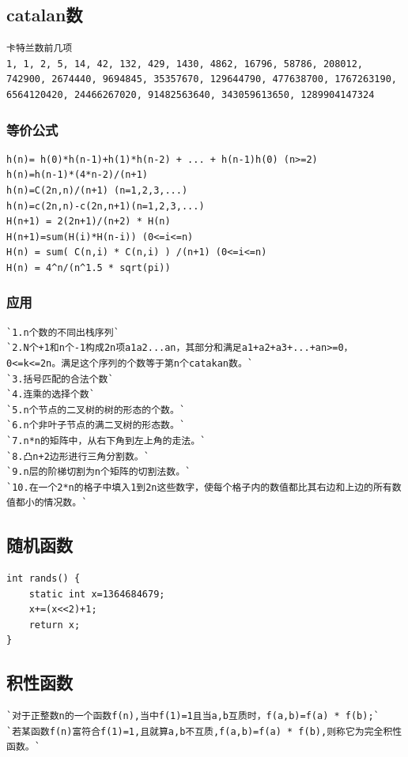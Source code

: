 \documentclass[a4paper]{article}
\begin{document}
\begin{CJK*}{UTF8}{gbsn}
\begin{multicols}{3}
\begin{flushleft}
\subsection{catalan数}
\begin{lstlisting}
卡特兰数前几项
1, 1, 2, 5, 14, 42, 132, 429, 1430, 4862, 16796, 58786, 208012, 742900, 2674440, 9694845, 35357670, 129644790, 477638700, 1767263190, 6564120420, 24466267020, 91482563640, 343059613650, 1289904147324 
\end{lstlisting}

\subsubsection{等价公式}
\begin{lstlisting}
h(n)= h(0)*h(n-1)+h(1)*h(n-2) + ... + h(n-1)h(0) (n>=2)
h(n)=h(n-1)*(4*n-2)/(n+1)
h(n)=C(2n,n)/(n+1) (n=1,2,3,...)
h(n)=c(2n,n)-c(2n,n+1)(n=1,2,3,...)
H(n+1) = 2(2n+1)/(n+2) * H(n)
H(n+1)=sum(H(i)*H(n-i)) (0<=i<=n)
H(n) = sum( C(n,i) * C(n,i) ) /(n+1) (0<=i<=n)
H(n) = 4^n/(n^1.5 * sqrt(pi))
\end{lstlisting}

\subsubsection{应用}
\begin{lstlisting}
`1.n个数的不同出栈序列`
`2.N个+1和n个-1构成2n项a1a2...an，其部分和满足a1+a2+a3+...+an>=0，0<=k<=2n。满足这个序列的个数等于第n个catakan数。`
`3.括号匹配的合法个数`
`4.连乘的选择个数`
`5.n个节点的二叉树的树的形态的个数。`
`6.n个非叶子节点的满二叉树的形态数。`
`7.n*n的矩阵中，从右下角到左上角的走法。`
`8.凸n+2边形进行三角分割数。`
`9.n层的阶梯切割为n个矩阵的切割法数。`
`10.在一个2*n的格子中填入1到2n这些数字，使每个格子内的数值都比其右边和上边的所有数值都小的情况数。`
\end{lstlisting}

\subsection{随机函数}
\begin{lstlisting}
int rands() {
    static int x=1364684679;
    x+=(x<<2)+1;
    return x;
}
\end{lstlisting}

\subsection{积性函数}
\begin{lstlisting}
`对于正整数n的一个函数f(n),当中f(1)=1且当a,b互质时，f(a,b)=f(a) * f(b);`
`若某函数f(n)富符合f(1)=1,且就算a,b不互质,f(a,b)=f(a) * f(b),则称它为完全积性函数。`


\end{lstlisting}
\end{flushleft}
\end{multicols}
\end{CJK*}
\end{document}
